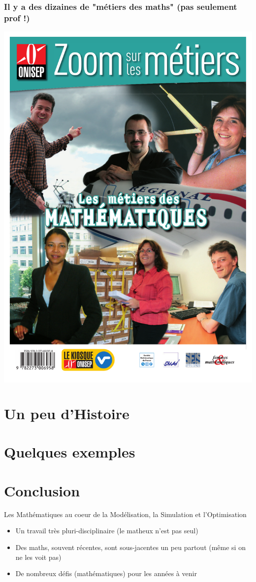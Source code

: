 \documentclass[slideopt,A4]{beamer}
\begin{document}
%
\begin{frame}
\frametitle{Il y a des dizaines de "métiers des maths" {\small (pas seulement prof !) }}
%
\begin{center}
\includegraphics[width=0.4\linewidth]{onisep.pdf}
\end{center}
%
\centerline{}
%
\end{frame}

\section{Un peu d'Histoire}









\section{Quelques exemples}
\label{sec:quelques-exemples}







\section{Conclusion}

\begin{frame}{Les Mathématiques au coeur de la Modélisation, la Simulation et l'Optimisation}
  
\begin{itemize}
\item Un travail très pluri-disciplinaire  (le matheux n'est pas seul)
\item Des maths, souvent récentes, sont sous-jacentes un peu partout (même si on ne les voit pas)
\item De nombreux défis (mathématiques) pour les années à venir %
\end{itemize}


\end{frame}
\end{document}
